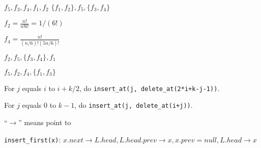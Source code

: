 \documentclass[12pt,twoside]{article}
\begin{document}


\begin{problems}

\problem  %

\begin{problemparts}
\problempart %
$f_5, f_3, f_4, f_1, f_2$
\problempart %
$\{f_1,f_2\},f_5,\{f_3,f_4\}$
\problempart %

$f_2=\frac{n!}{n! 6!}=1/(6!)$

$f_4=\frac{n!}{(n/6)! (5n/6)!}$

$f_2,f_5,\{f_3,f_4\},f_1$ 

\problempart %

$f_5,f_2,f_4,\{f_1,f_3\}$
\end{problemparts}

\newpage
\problem  %

\begin{problemparts}
\problempart %
For $j$ equals $i$ to $i+k/2$, do \verb|insert_at(j, delete_at(2*i+k-j-1))|.

\problempart %
For $j$ equals $0$ to $k-1$, do \verb|insert_at(j, delete_at(i+j))|.

\end{problemparts}

\newpage
\problem  %





\newpage
\problem  %



``$\rightarrow$'' means point to

\begin{problemparts}
\problempart %


\verb|insert_first(x)|: $x.next\rightarrow L.head, L.head.prev\rightarrow x, x.prev=null, L.head\rightarrow x$


\end{problemparts}
\end{problems}
\end{document}
